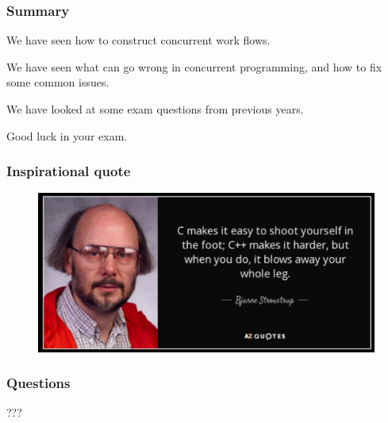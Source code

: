 \documentclass[xcolor={usenames,dvipsnames}]{beamer}
\begin{document}
%
%
%
\begin{frame}
\frametitle{Summary}
We have seen how to construct concurrent work flows.

\vspace{5mm}
We have seen what can go wrong in concurrent programming, and how to
fix some common issues.

\vspace{5mm}
We have looked at some exam questions from previous years.

\vspace{5mm}
Good luck in your exam.
\end{frame}



%
%
%
\begin{frame}
\frametitle{Inspirational quote}

\begin{figure}
\includegraphics[width=1.0\textwidth]{images/inspirational-quote.png}
\end{figure}

\end{frame}



%
%
%
\begin{frame}
\frametitle{Questions}

???
\end{frame}
\end{document}
